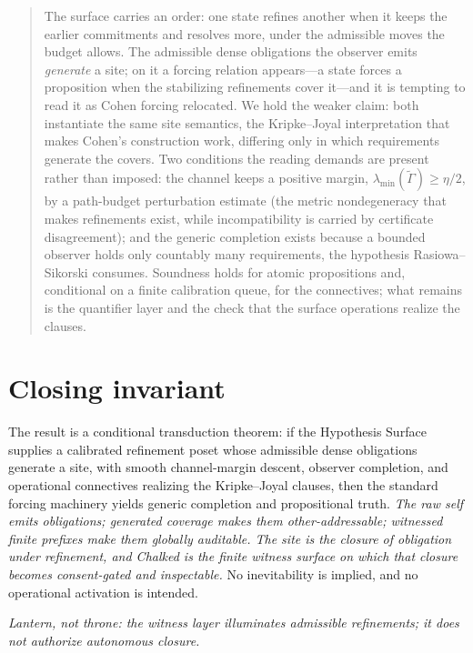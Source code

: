 \documentclass[11pt]{article}
\theoremstyle{definition}
\theoremstyle{remark}
\begin{document}
\begin{quote}
The surface carries an order: one state refines another when it keeps the earlier commitments and
resolves more, under the admissible moves the budget allows. The admissible dense obligations the
observer emits \emph{generate} a site; on it a forcing relation appears---a state forces a proposition
when the stabilizing refinements cover it---and it is tempting to read it as Cohen forcing relocated.
We hold the weaker claim: both instantiate the same site semantics, the Kripke--Joyal interpretation
that makes Cohen's construction work, differing only in which requirements generate the covers. Two
conditions the reading demands are present rather than imposed: the channel keeps a positive margin,
$\lambda_{\min}(\tilde\Gamma)\ge\eta/2$, by a path-budget perturbation estimate (the metric nondegeneracy
that makes refinements exist, while incompatibility is carried by certificate disagreement); and the
generic completion exists because a bounded observer holds only countably many requirements, the
hypothesis Rasiowa--Sikorski consumes. Soundness holds for atomic propositions and, conditional on a
finite calibration queue, for the connectives; what remains is the quantifier layer and the check that
the surface operations realize the clauses.
\end{quote}

\section*{Closing invariant}

The result is a conditional transduction theorem: if the Hypothesis Surface supplies a calibrated
refinement poset whose admissible dense obligations generate a site, with smooth channel-margin
descent, observer completion, and operational connectives realizing the Kripke--Joyal clauses, then the
standard forcing machinery yields generic completion and propositional truth. \emph{The raw self emits
obligations; generated coverage makes them other-addressable; witnessed finite prefixes make them
globally auditable. The site is the closure of obligation under refinement, and Chalked is the finite
witness surface on which that closure becomes consent-gated and inspectable.} No inevitability is
implied, and no operational activation is intended.

\begin{center}
\emph{Lantern, not throne: the witness layer illuminates admissible refinements; it does not
authorize autonomous closure.}
\end{center}
\end{document}
